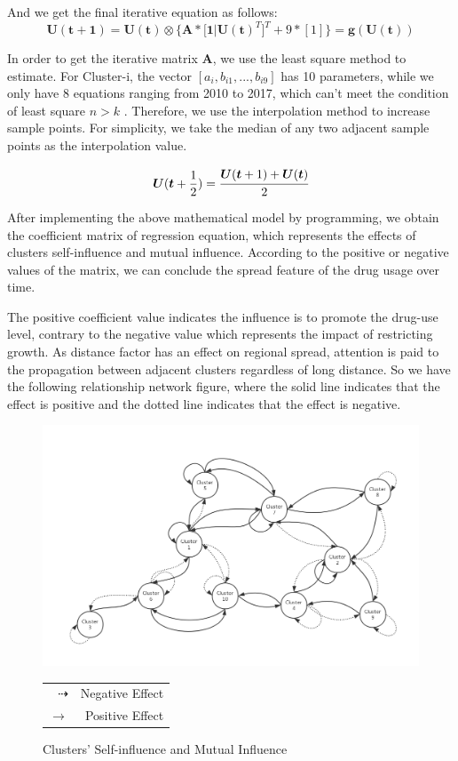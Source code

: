 \documentclass[12pt]{article}
\begin{document}
And we get the final iterative equation as follows:
\begin{equation}
	\bm{U(t+1) = U(t)} \otimes \{\bm{A * [1 | U(t)}^{T}]^{T} + 9 * [1]\} = \bm{g(U(t))}
\end{equation}

In order to get the iterative matrix $\bm{A}$, we use the least square method to estimate. For Cluster-i, the vector $[a_{i}, b_{i1}, ..., b_{i9}]$ has 10 parameters, while we only have 8 equations ranging from 2010 to 2017, which can’t meet the condition of least square $n > k$ . Therefore, we use the interpolation method to increase sample points. For simplicity, we take the median of any two adjacent sample points as the interpolation value.

\begin{equation}
	\bm{U}(\bm{t}+\frac{1}{2}) = \cfrac{\bm{U}(\bm{t}+1) + \bm{U}(\bm{t})}{2}
\end{equation}

After implementing the above mathematical model by programming, we obtain the coefficient matrix of regression equation, which represents the effects of clusters self-influence and mutual influence. According to the positive or negative values of the matrix, we can conclude the spread feature of the drug usage over time. 

The positive coefficient value indicates the influence is to promote the drug-use level, contrary to the negative value which represents the impact of restricting growth. As distance factor has an effect on regional spread, attention is paid to the propagation between adjacent clusters regardless of long distance. So we have the following relationship network figure, where the solid line indicates that the effect is positive and the dotted line indicates that the effect is negative.

\begin{figure}[H]
	\centering
	\includegraphics[scale=0.45]{./figures/15.png}
	\small
	\begin{tabular}{rr}
		$\dashrightarrow$ & Negative Effect \\
		$\longrightarrow$ & Positive Effect
	\end{tabular}
	\caption{Clusters' Self-influence and Mutual Influence}
	\label{Fig15}
\end{figure}
\end{document}

